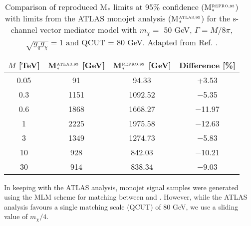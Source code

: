 \begin{flushleft}
\begin{table}[!htbp]
\centering
\begin{tabular}{c|c|c|c}
 \hline
 \hline
 $M$ [TeV] & M$_{*}^{\mbox{\tiny ATLAS,95}}$ [GeV] & M$_{*}^{\mbox{\tiny REPRO,95}}$ [GeV] & Difference [\%] \\ 
 \hline
0.05 & 91 & 94.33 & +3.53 \\
0.3 & 1151 & 1092.52 & $-$5.35 \\
0.6 & 1868 & 1668.27 & $-$11.97 \\
1 & 2225 & 1975.58 & $-$12.63 \\
3 & 1349 & 1274.73 & $-$5.83 \\
10 & 928 & 842.03 & $-$10.21 \\
30 & 914 & 838.34 & $-$9.03\\
 \hline
 \hline
\end{tabular}
\caption{Comparison of reproduced M$_{*}$ limits at 95\% confidence (M$_{*}^{\mbox{\tiny REPRO,95}}$) with limits from the ATLAS monojet analysis (M$_{*}^{\mbox{\tiny ATLAS,95}}$) for the s-channel vector mediator model with $m_{\chi} = $ 50 GeV, $\Gamma = M/8\pi$, $\sqrt{g_{q}g_{\chi}} = 1$ and QCUT = 80 GeV. Adapted from Ref. \cite{Aad:2015zva}.}
\label{M_star_limits_monojet}
\end{table}
\bigskip

In keeping with the ATLAS analysis, monojet signal samples were generated using the MLM scheme for matching between \MG and \PYTHIA. However, while the ATLAS analysis favours a single matching scale (QCUT) of 80 GeV, we use a sliding value of $m_{\chi}/4$.   


\end{flushleft}
